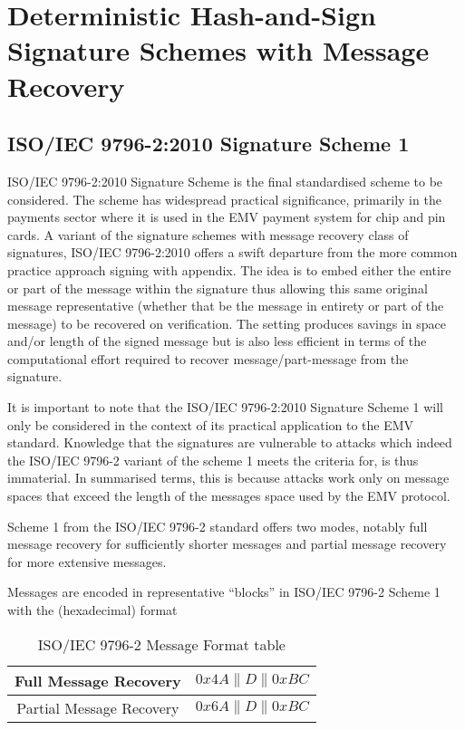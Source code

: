 \documentclass[]{final_report}
\theoremstyle{definition}
\begin{document}
\section{Deterministic Hash-and-Sign Signature Schemes with Message Recovery}
\subsection{ISO/IEC 9796-2:2010 Signature Scheme 1}
ISO/IEC 9796-2:2010 Signature Scheme is the final standardised scheme to be considered. The scheme has widespread practical significance, primarily in the payments sector where it is used in the EMV payment system for chip and pin cards. A variant of the signature schemes with message recovery class of signatures, ISO/IEC 9796-2:2010 offers a swift departure from the more common practice approach signing with appendix. The idea is to embed either the entire or part of the message within the signature thus allowing this same original message representative (whether that be the message in entirety or part of the message) to be recovered on verification. The setting produces savings in space and/or length of the signed message but is also less efficient in terms of the computational effort required to recover message/part-message from the signature.

It is important to note that the ISO/IEC 9796-2:2010 Signature Scheme 1 will only be considered in the context of its practical application to the EMV standard. Knowledge that the signatures are vulnerable to attacks which indeed the ISO/IEC 9796-2 variant of the scheme 1 meets the criteria for, is thus immaterial. In summarised terms, this is because attacks work only on message spaces that exceed the length of the messages space used by the EMV protocol.

Scheme 1 from the ISO/IEC 9796-2 standard offers two modes, notably full message recovery for sufficiently shorter messages and partial message recovery for more extensive messages.

Messages are encoded in representative “blocks” in ISO/IEC 9796-2 Scheme 1 with the (hexadecimal) format
\begin{table}[h]
    \centering
    \begin{tabular}{|c|c|}
    \hline
    Full Message Recovery & $0x4A\|D\|0xBC$ \\
    \hline
    Partial Message Recovery & $0x6A\|D\|0xBC$ \\
    \hline
    \end{tabular}
    \caption{ISO/IEC 9796-2 Message Format table}
    \label{tab:msg_form_tab}
\end{table}
\end{document}
